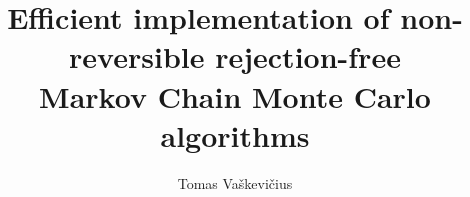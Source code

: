 \documentclass[12pt]{ociamthesis}
\title{Efficient implementation of non-reversible rejection-free \\
       Markov Chain Monte Carlo algorithms}
\author{Tomas Vaškevičius}
\begin{document}
\maketitle

\setcounter{tocdepth}{1}
\begin{romanpages}
\tableofcontents
\end{romanpages}


\appendix

\cleardoublepage
{}
\renewcommand{\bibname}{References}

\end{document}
